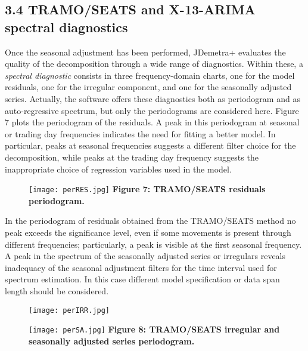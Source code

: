 \documentclass{article}
\begin{document}
\subsection*{\small 3.4 TRAMO/SEATS and X-13-ARIMA spectral diagnostics}
Once the seasonal adjustment has been performed, JDemetra+ evaluates the quality of the decomposition through a wide range of diagnostics. Within these, a \textit{spectral diagnostic} consists in three frequency-domain charts, one for the model residuals, one for the irregular component, and one for the seasonally adjusted series. Actually, the software offers these diagnostics both as periodogram and as auto-regressive spectrum, but only the periodograms are considered here. Figure 7 plots the periodogram of the residuals. A peak in this periodogram at seasonal or trading day frequencies indicates the need for fitting a better model. In particular, peaks at seasonal frequencies suggests a different filter choice for the decomposition, while peaks at the trading day frequency suggests the inappropriate choice of regression variables used in the model.
\begin{figure}[H]
\centering
  \texttt{[image: perRES.jpg]}
  {\textbf{\scriptsize Figure 7: TRAMO/SEATS residuals periodogram.}}
  \label{fig:1}
\end{figure}
In the periodogram of residuals obtained from the TRAMO/SEATS method no peak exceeds the significance level, even if some movements is present through different frequencies; particularly, a peak is visible at the first seasonal frequency. A peak in the spectrum of the seasonally adjusted series or irregulars reveals inadequacy of the seasonal adjustment filters for the time interval used for spectrum estimation. In this case different model specification or data span length should be considered.
\begin{figure}[H]
  \texttt{[image: perIRR.jpg]}
\end{figure}
\begin{figure}[H]
\centering
  \texttt{[image: perSA.jpg]}
  {\textbf{\scriptsize Figure 8: TRAMO/SEATS irregular and seasonally adjusted series periodogram.}}
\end{figure}
\end{document}

